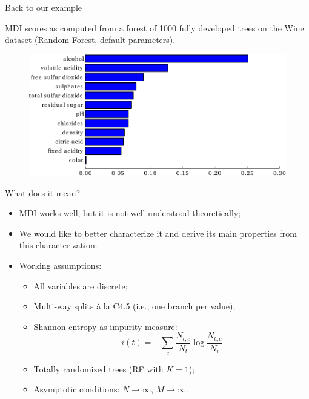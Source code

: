 \documentclass{beamer}
\begin{document}
\begin{frame}{Back to our example}

MDI scores as computed from a forest of 1000 fully developed trees on the  Wine
dataset (Random Forest, default parameters).

\begin{figure}
    \includegraphics[scale=0.7]{./figures/imp-wine.pdf}
\end{figure}

\end{frame}

\begin{frame}{What does it mean?}
\begin{itemize}
\item MDI works well, but it is not well understood theoretically;
\item We would like to better characterize it and derive its main
  properties from this characterization.

\bigskip

\item Working assumptions:
\begin{itemize}
\item All variables are discrete;
\item Multi-way splits \`a la C4.5 (i.e., one branch per value);
\item Shannon entropy as impurity measure:
$$i(t) = - \sum_{c} \frac{N_{t,c}}{N_t} \log \frac{N_{t,c}}{N_t}$$
\item {\color{red} Totally randomized trees (RF with $K=1$);}
\item {\color{red} Asymptotic conditions: $N\to \infty$, $M\to \infty$.}
\end{itemize}
\end{itemize}
\end{frame}
\end{document}
